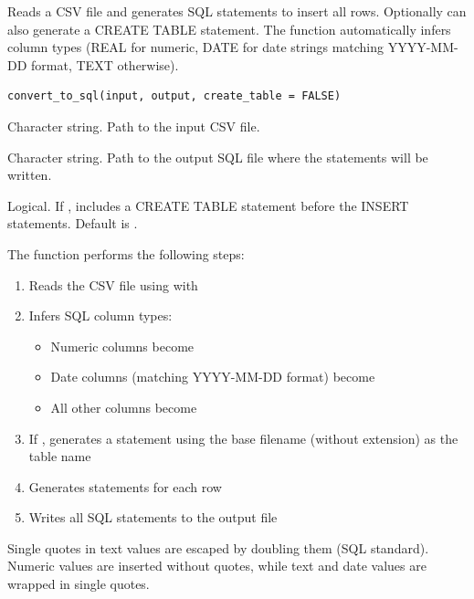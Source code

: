\documentclass[a4paper]{book}
\begin{document}
%
\begin{Description}
Reads a CSV file and generates SQL statements to insert all rows. Optionally
can also generate a CREATE TABLE statement. The function automatically infers
column types (REAL for numeric, DATE for date strings matching YYYY-MM-DD
format, TEXT otherwise).
\end{Description}
%
\begin{Usage}
\begin{verbatim}
convert_to_sql(input, output, create_table = FALSE)
\end{verbatim}
\end{Usage}
%
\begin{Arguments}
\begin{ldescription}
\item[\code{input}] Character string. Path to the input CSV file.

\item[\code{output}] Character string. Path to the output SQL file where the
statements will be written.

\item[\code{create\_table}] Logical. If , includes a CREATE TABLE
statement before the INSERT statements. Default is .
\end{ldescription}
\end{Arguments}
%
\begin{Details}
The function performs the following steps:
\begin{enumerate}

\item{} Reads the CSV file using  with
\item{} Infers SQL column types:
\begin{itemize}

\item{} Numeric columns become 
\item{} Date columns (matching YYYY-MM-DD format) become 
\item{} All other columns become 

\end{itemize}

\item{} If , generates a 
statement using the base filename (without extension) as the table name
\item{} Generates  statements for each row
\item{} Writes all SQL statements to the output file

\end{enumerate}


Single quotes in text values are escaped by doubling them (SQL standard).
Numeric values are inserted without quotes, while text and date values are
wrapped in single quotes.
\end{Details}
\end{document}
